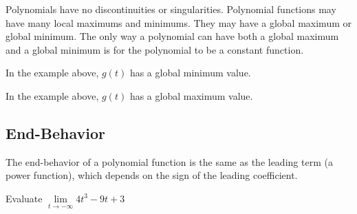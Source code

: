 \documentclass{ximera}
\begin{document}
Polynomials have no discontinuities or singularities.  Polynomial functions may have many local maximums and minimums. They may have a global maximum or global minimum.  The only way a polynomial can have both a global maximum and a global minimum is for the polynomial to be a constant function. 







\begin{question}

In the example above, $g(t)$ has a global minimum value.



\begin{multipleChoice}
\end{multipleChoice}

\end{question}



\begin{question}

In the example above, $g(t)$ has a global maximum value.



\begin{multipleChoice}
\end{multipleChoice}

\end{question}










\subsection*{End-Behavior}


The end-behavior of a polynomial function is the same as the leading term (a power function), which depends on the sign of the leading coefficient.











\begin{question}

Evaluate $\lim\limits_{t \to -\infty} 4 t^3 - 9 t + 3$


\begin{multipleChoice}
\choice [correct]{$-\infty$}
\choice {$\infty$}
\end{multipleChoice}

\end{question}
\end{document}
